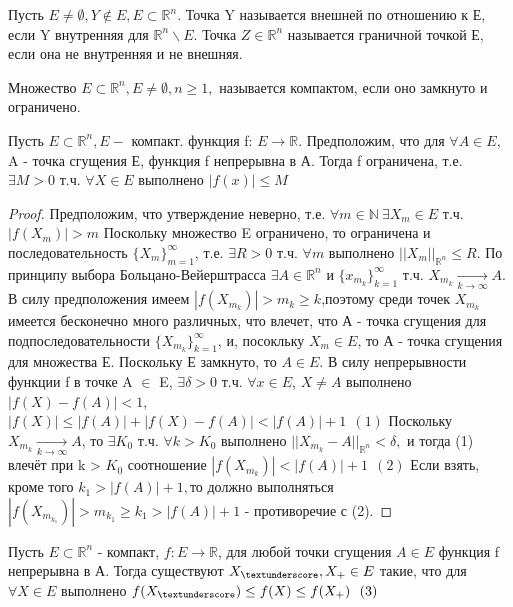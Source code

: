 \begin{definition}
	Пусть $E \neq \emptyset, Y \notin E, E \subset \mathbb{R}^n.$ Точка Y называется внешней по отношению к Е, если Y внутренняя для $\mathbb{R}^n \backslash E.$ Точка $Z \in \mathbb{R}^n$ называется граничной точкой Е, если она не внутренняя и не внешняя.
\end{definition}
\begin{definition}
	Множество $E \subset \mathbb{R}^n, E \neq \emptyset, n \geq 1,$ называется компактом, если оно замкнуто и ограничено.
\end{definition}
\begin{theorem}
	 Пусть $E \subset \mathbb{R}^n, E - $ компакт. функция f: $E \to \mathbb{R}$. Предположим, что для $\forall A \in E,$ A - точка сгущения Е, функция f непрерывна в А. Тогда f ограничена, т.е. $\exists M > 0$ т.ч. $\forall X \in E$ выполнено $|f(x)| \leq M$ 
\end{theorem}
\begin{proof}
	Предположим, что утверждение неверно, т.е. $\forall m \in \mathbb{N} \ \exists X_m \in E$ т.ч. $|f(X_m)|>m$ Поскольку множество E ограничено, то ограничена и последовательность $\{X_m\}_{m=1}^{\infty}$, т.е. $\exists R > 0$ т.ч. $\forall m$ выполнено $||X_m||_{\mathbb{R}^n} \leq R.$ По принципу выбора Больцано-Вейерштрасса $\exists A \in \mathbb{R}^n$ и $\{x_{m_k}\}_{k = 1}^{\infty}$ т.ч. $X_{m_k} \underset{k \to \infty}{\to} A$. В силу предположения имеем $|f(X_{m_k})| > m_k \geq k$,поэтому среди точек $X_{m_k}$ имеется бесконечно много различных, что влечет, что А - точка сгущения для подпоследовательности $\{X_{m_k}\}_{k=1}^{\infty}$, и, посокльку $X_m \in E$, то А - точка сгущения для множества Е. Поскольку Е замкнуто, то $A \in E$. В силу непрерывности функции f в точке A $\in$ E, $\exists \delta > 0$ т.ч. $\forall x \in E$, $X \neq A$ выполнено $|f(X)-f(A)|<1$, \ \ $|f(X)| \leq |f(A)|+|f(X)-f(A)| < |f(A)| + 1 \ \ (1)$
	Поскольку $X_{m_k} \underset{k \to \infty}{\to} A$, то $\exists K_0$ т.ч. $\forall k > K_0$ выполнено $||X_{m_k}-A||_{\mathbb{R}^n}<\delta,$ и тогда (1) влечёт при k > $K_0$ соотношение $|f(X_{m_k})| < |f(A)| +1 \ \ (2)$ Если взять, кроме того $k_1 > |f(A)| + 1,$то должно выполняться $|f(X_{m_{k_1}})| > m_{k_{1}}\geq k_1 > |f(A)| + 1 $ - противоречие с (2). 
\end{proof}
\begin{theorem}
	Пусть $E \subset \mathbb{R}^n$ - компакт, $f: E \to \mathbb{R}$, для любой точки сгущения $A \in E$ функция f непрерывна в А. Тогда существуют $X_{\textunderscore},X_{+} \in E$ такие, что для $\forall X \in E$ выполнено $f(X_{\textunderscore}) \leq f(X) \leq f(X_{+}) \ \ (3)$
\end{theorem}
